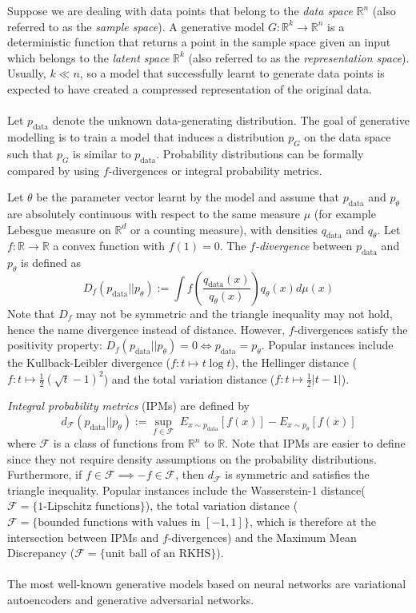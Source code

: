 \documentclass{article}
\theoremstyle{definition}
\theoremstyle{lemma}
\theoremstyle{theorem}
\DeclareMathOperator*{\data}{\text{data}}
\begin{document}
Suppose we are dealing with data points that belong to the \textit{data space} $\mathbb R^n$ (also referred to as the \textit{sample space}). A generative model $G:\mathbb R^k \to \mathbb R^n$ is a deterministic function that returns a point in the sample space given an input which belongs to the \textit{latent space} $\mathbb R^k$ (also referred to as the \textit{representation space}). Usually, $k\ll n$, so a model that successfully learnt to generate data points is expected to have created a compressed representation of the original data.\\
\\
Let $p_{\data}$ denote the unknown data-generating distribution. The goal of generative modelling is to train a model that induces a distribution $p_G$ on the data space such that $p_G$ is similar to $p_{\data}$. Probability distributions can be formally compared by using $f$-divergences or integral probability metrics.

Let $\theta$ be the parameter vector learnt by the model and assume that $p_{\data}$ and $p_\theta$ are absolutely continuous with respect to the same measure $\mu$ (for example Lebesgue measure on $\mathbb R^d$ or a counting measure), with densities $q_{\data}$ and $q_\theta$. Let $f:\mathbb R \to \mathbb R$ a convex function with $f(1)=0$. The \textit{$f$-divergence} between $p_{\data}$ and $p_\theta$ is defined as $$D_f(p_{\data}||p_\theta):= \int  f\left(\frac{q_{\data}(x)}{q_\theta(x)}\right) q_\theta(x) d\mu(x)$$
Note that $D_f$ may not be symmetric and the triangle inequality may not hold, hence the name divergence instead of distance. However, $f$-divergences satisfy the positivity property: $D_f(p_{\data}||p_\theta) = 0 \iff p_{\data}=p_\theta$.
Popular instances include the Kullback-Leibler divergence ($f:t\mapsto t\log t$), the Hellinger distance ($f:t\mapsto \frac 12 (\sqrt t -1)^2$) and the total variation distance ($f:t\mapsto \frac 12 |t-1|$).

\textit{Integral probability metrics} (IPMs) are defined by 
$$d_{\mathcal F}(p_{\data}||p_\theta) := \sup_{f\in \mathcal F}\; E_{x\sim p_{\data}}[f(x)] - E_{x\sim p_\theta}[f(x)]$$
where $\mathcal F$ is a class of functions from $\mathbb R^n$ to $\mathbb R$. Note that IPMs are easier to define since they not require density assumptions on the probability distributions. Furthermore, if $f\in \mathcal F \implies -f\in \mathcal F$, then $d_\mathcal F$ is symmetric and satisfies the triangle inequality. Popular instances include the Wasserstein-1 distance\newline ($\mathcal F = \{\text{1-Lipschitz functions}\}$), the total variation distance ($\mathcal F = \{\text{bounded functions with values in }[-1,1]\}$, which is therefore at the intersection between IPMs and $f$-divergences) and the Maximum Mean Discrepancy ($\mathcal F = \{\text{unit ball of an RKHS}\}$).
\\ \\
The most well-known generative models based on neural networks are variational autoencoders and generative adversarial networks.
\end{document}
